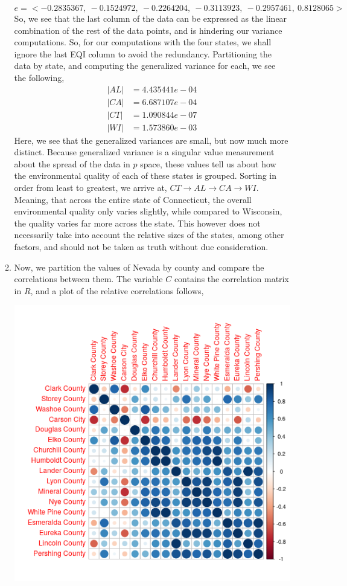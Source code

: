 \documentclass[letterpaper,10pt]{article}
\begin{document}
\begin{enumerate}
\begin{enumerate}
\[e=<-0.2835367,\ -0.1524972,\ -0.2264204,\ -0.3113923,\ -0.2957461,\  0.8128065>\]
So, we see that the last column of the data can be expressed as the linear combination of the rest of the data points, and is hindering our variance computations. So, for our computations with the four states, we shall ignore the last EQI column to avoid the redundancy. Partitioning the data by state, and computing the generalized variance for each, we see the following,
\begin{align*}
|AL| &= 4.435441e-04\\
|CA| &= 6.687107e-04\\
|CT| &= 1.090844e-07\\
|WI| &= 1.573860e-03
\end{align*}
Here, we see that the generalized variances are small, but now much more distinct. Because generalized variance is a singular value measurement about the spread of the data in $p$ space, these values tell us about how the environmental quality of each of these states is grouped. Sorting in order from least to greatest, we arrive at, $CT\to AL\to CA\to WI$. Meaning, that across the entire state of Connecticut, the overall environmental quality only varies slightly, while compared to Wisconsin, the quality varies far more across the state. This however does not necessarily take into account the relative sizes of the states, among other factors, and should not be taken as truth without due consideration.
\item Now, we partition the values of Nevada by county and compare the correlations between them. The variable $C$ contains the correlation matrix in $R$, and a plot of the relative correlations follows,
\begin{center}
\includegraphics[scale=1]{corr.png}

\end{center}
\end{enumerate}
\end{enumerate}
\end{document}
